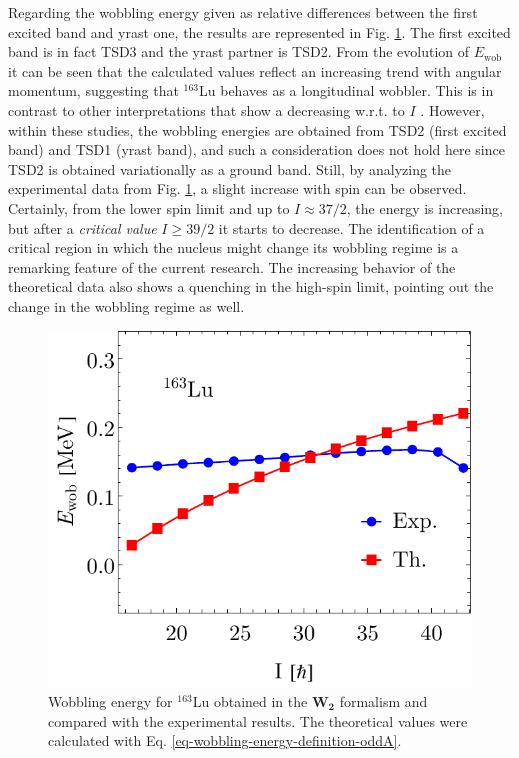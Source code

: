 Regarding the wobbling energy given as relative differences between the first excited band and yrast one, the results are represented in Fig. \ref{163Lu-wobbling-energy-parity-partners}. The first excited band is in fact TSD3 and the yrast partner is TSD2. From the evolution of $E_\text{wob}$ it can be seen that the calculated values reflect an increasing trend with angular momentum, suggesting that $^{163}$Lu behaves as a longitudinal wobbler. This is in contrast to other interpretations that show a decreasing w.r.t. to $I$ \cite{frauendorf2014transverse,frauendorf2018comment,tanabe2018reply}. However, within these studies, the wobbling energies are obtained from TSD2 (first excited band) and TSD1 (yrast band), and such a consideration does not hold here since TSD2 is obtained variationally as a ground band. Still, by analyzing the experimental data from Fig. \ref{163Lu-wobbling-energy-parity-partners}, a slight increase with spin can be observed. Certainly, from the lower spin limit and up to $I\approx 37/2$, the energy is increasing, but after a \emph{critical value} $I\geq 39/2$ it starts to decrease. The identification of a critical region in which the nucleus might change its wobbling regime is a remarking feature of the current research. The increasing behavior of the theoretical data also shows a quenching in the high-spin limit, pointing out the change in the wobbling regime as well.
\begin{figure}
    \centering
    \includegraphics[scale=0.85]{Chapters/Figures/Wobbling-Energy-Parity-Partners.pdf}
    \caption{Wobbling energy for $^{163}$Lu obtained in the $\mathbf{W_2}$ formalism and compared with the experimental results. The theoretical values were calculated with Eq. \ref{eq-wobbling-energy-definition-oddA}.}
    \label{163Lu-wobbling-energy-parity-partners}
\end{figure}

